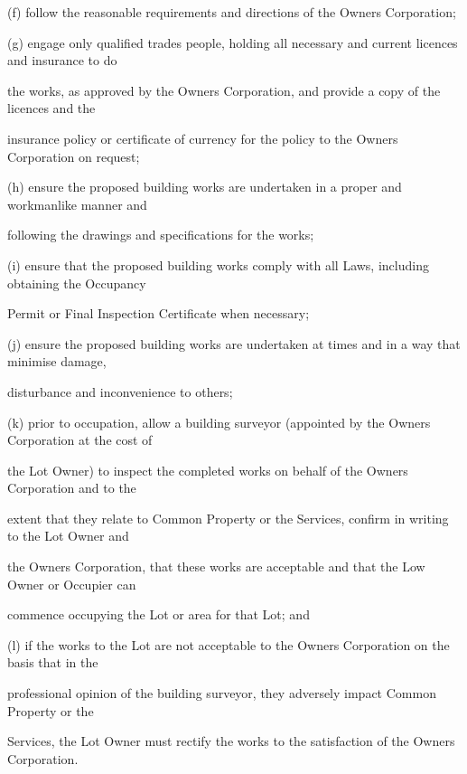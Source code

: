 \documentclass{article}
\begin{document}
{\fontsize{9.962}{1}(f) follow the reasonable requirements and directions of the Owners Corporation; }

{\fontsize{9.962}{1}(g) engage only qualified trades people, holding all necessary and current licences and insurance to do }

{\fontsize{10.02}{1}the works, as approved by the Owners Corporation, and provide a copy of the licences and the }

{\fontsize{10.02}{1}insurance policy or certificate of currency for the policy to the Owners Corporation on request; }

{\fontsize{9.962}{1}(h) ensure the proposed building works are undertaken in a proper and workmanlike manner and }

{\fontsize{10.02}{1}following the drawings and specifications for the works; }

{\fontsize{9.962}{1}(i) ensure that the proposed building works comply with all Laws, including obtaining the Occupancy }

{\fontsize{10.02}{1}Permit or Final Inspection Certificate when necessary; }

{\fontsize{9.962}{1}(j) ensure the proposed building works are undertaken at times and in a way that minimise damage, }

{\fontsize{10.02}{1}disturbance and inconvenience to others; }

{\fontsize{9.962}{1}(k) prior to occupation, allow a building surveyor (appointed by the Owners Corporation at the cost of }

{\fontsize{10.02}{1}the Lot Owner) to inspect the completed works on behalf of the Owners Corporation and to the }

{\fontsize{10.02}{1}extent that they relate to Common Property or the Services, confirm in writing to the Lot Owner and }

{\fontsize{10.02}{1}the Owners Corporation, that these works are acceptable and that the Low Owner or Occupier can }

{\fontsize{10.02}{1}commence occupying the Lot or area for that Lot; and }

{\fontsize{9.962}{1}(l) if the works to the Lot are not acceptable to the Owners Corporation on the basis that in the }

{\fontsize{10.02}{1}professional opinion of the building surveyor, they adversely impact Common Property or the }

{\fontsize{10.02}{1}Services, the Lot Owner must rectify the works to the satisfaction of the Owners Corporation. }
\end{document}
